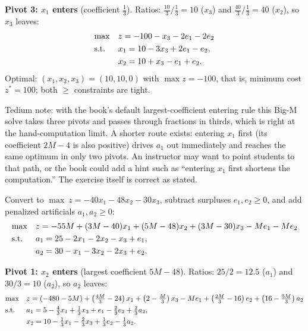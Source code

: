 \textbf{Pivot 3: $x_1$ enters} (coefficient $\tfrac13$). Ratios:
$\tfrac{10}{3}/\tfrac13 = 10$ ($x_3$) and $\tfrac{40}{3}/\tfrac13 = 40$
($x_2$), so $x_3$ leaves:
\[
\begin{aligned}
\max\quad & z = -100 - x_3 - 2e_1 - 2e_2 \\
\text{s.t.}\;\;\quad & x_1 = 10 - 3x_3 + 2e_1 - e_2, \\
& x_2 = 10 + x_3 - e_1 + e_2.
\end{aligned}
\]
Optimal: $(x_1, x_2, x_3) = (10, 10, 0)$ with $\max z = -100$, that is,
minimum cost $z^* = 100$; both $\geq$ constraints are tight.

\begin{qaflag}
Tedium note: with the book's default largest-coefficient entering rule this
Big-M solve takes three pivots and passes through fractions in thirds,
which is right at the hand-computation limit. A shorter route exists:
entering $x_1$ first (its coefficient $2M - 4$ is also positive) drives
$a_1$ out immediately and reaches the same optimum in only two pivots.
An instructor may want to point students to that path, or the book could
add a hint such as ``entering $x_1$ first shortens the computation.''
The exercise itself is correct as stated.
\end{qaflag}


Convert to $\max\ z = -40x_1 - 48x_2 - 30x_3$, subtract surpluses
$e_1, e_2 \geq 0$, and add penalized artificials $a_1, a_2 \geq 0$:
\[
\begin{aligned}
\max\quad & z = -55M + (3M - 40)x_1 + (5M - 48)x_2 + (3M - 30)x_3 - M e_1 - M e_2 \\
\text{s.t.}\;\;\quad & a_1 = 25 - 2x_1 - 2x_2 - x_3 + e_1, \\
& a_2 = 30 - x_1 - 3x_2 - 2x_3 + e_2.
\end{aligned}
\]

\textbf{Pivot 1: $x_2$ enters} (largest coefficient $5M - 48$). Ratios:
$25/2 = 12.5$ ($a_1$) and $30/3 = 10$ ($a_2$), so $a_2$ leaves:
\[
\begin{aligned}
\max\quad & z = (-480 - 5M) + \left(\tfrac{4M}{3} - 24\right)x_1
  + \left(2 - \tfrac{M}{3}\right)x_3 - M e_1
  + \left(\tfrac{2M}{3} - 16\right)e_2 + \left(16 - \tfrac{5M}{3}\right)a_2 \\
\text{s.t.}\;\;\quad & a_1 = 5 - \tfrac43 x_1 + \tfrac13 x_3 + e_1 - \tfrac23 e_2 + \tfrac23 a_2, \\
& x_2 = 10 - \tfrac13 x_1 - \tfrac23 x_3 + \tfrac13 e_2 - \tfrac13 a_2.
\end{aligned}
\]

